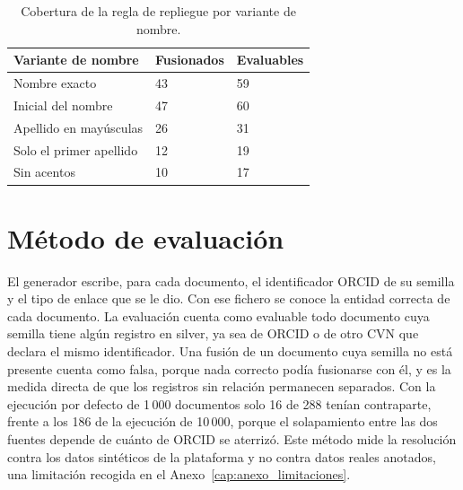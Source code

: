 \begin{table}[H]
  \centering
  \small
  \renewcommand{\arraystretch}{1.15}
  \begin{tabular}{
    >{\raggedright\arraybackslash}p{}
    p{} p{}}
    \hline
    \textbf{Variante de nombre} & \textbf{Fusionados} & \textbf{Evaluables} \\
    \hline
    Nombre exacto & 43 & 59 \\
    Inicial del nombre & 47 & 60 \\
    Apellido en mayúsculas & 26 & 31 \\
    Solo el primer apellido & 12 & 19 \\
    Sin acentos & 10 & 17 \\
    \hline
  \end{tabular}
  \caption{Cobertura de la regla de repliegue por variante de nombre.}
  \label{tab:anexo_variantes}
\end{table}

\section{Método de evaluación}
\label{sec:anexo_resolucion_evaluacion}

El generador escribe, para cada documento, el identificador ORCID de su
semilla y el tipo de enlace que se le dio. Con ese fichero se conoce la
entidad correcta de cada documento. La evaluación cuenta como evaluable todo
documento cuya semilla tiene algún registro en silver, ya sea de ORCID o de otro CVN
que declara el mismo identificador. Una fusión de un
documento cuya semilla no está presente cuenta como falsa, porque nada
correcto podía fusionarse con él, y es la medida directa de que los
registros sin relación permanecen separados. Con la ejecución por defecto de 1\,000 documentos solo 16 de 288 tenían contraparte, frente a los 186 de la ejecución de 10\,000, porque el solapamiento entre las dos fuentes depende de cuánto de ORCID se aterrizó. Este método mide la
resolución contra los datos sintéticos de la plataforma y no contra datos
reales anotados, una limitación recogida en el
Anexo~\ref{cap:anexo_limitaciones}.
